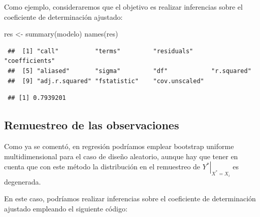 \documentclass[
]{book}
\newenvironment{Shaded}{\begin{snugshade}}{\end{snugshade}}
\newcommand{\AttributeTok}[1]{\textcolor[rgb]{0.77,0.63,0.00}{#1}}
\newcommand{\ControlFlowTok}[1]{\textcolor[rgb]{0.13,0.29,0.53}{\textbf{#1}}}
\newcommand{\DecValTok}[1]{\textcolor[rgb]{0.00,0.00,0.81}{#1}}
\newcommand{\FunctionTok}[1]{\textcolor[rgb]{0.00,0.00,0.00}{#1}}
\newcommand{\NormalTok}[1]{#1}
\newcommand{\OtherTok}[1]{\textcolor[rgb]{0.56,0.35,0.01}{#1}}
\newcommand{\SpecialCharTok}[1]{\textcolor[rgb]{0.00,0.00,0.00}{#1}}
\theoremstyle{break}
\theoremstyle{nonumberplain}
\begin{document}
Como ejemplo, consideraremos que el objetivo es realizar inferencias sobre el coeficiente de determinación ajustado:

\begin{Shaded}
\begin{Highlighting}[]
\NormalTok{res }\OtherTok{\textless{}{-}} \FunctionTok{summary}\NormalTok{(modelo)}
\FunctionTok{names}\NormalTok{(res)}
\end{Highlighting}
\end{Shaded}

\begin{verbatim}
 ##  [1] "call"          "terms"         "residuals"     "coefficients" 
 ##  [5] "aliased"       "sigma"         "df"            "r.squared"    
 ##  [9] "adj.r.squared" "fstatistic"    "cov.unscaled"
\end{verbatim}

\begin{Shaded}
\end{Shaded}

\begin{verbatim}
 ## [1] 0.7939201
\end{verbatim}

\hypertarget{boot-unif-reg}{%
\subsection{Remuestreo de las observaciones}\label{boot-unif-reg}}

Como ya se comentó, en regresión podríamos emplear bootstrap uniforme multidimensional para el caso de diseño aleatorio, aunque hay que tener en cuenta que con este método la distribución en el remuestreo de \(\left. Y^{\ast}\right\vert _{X^{\ast}=X_i}\) es degenerada.

En este caso, podríamos realizar inferencias sobre el coeficiente de determinación ajustado empleando el siguiente código:

\begin{Shaded}
\end{Shaded}
\end{document}
